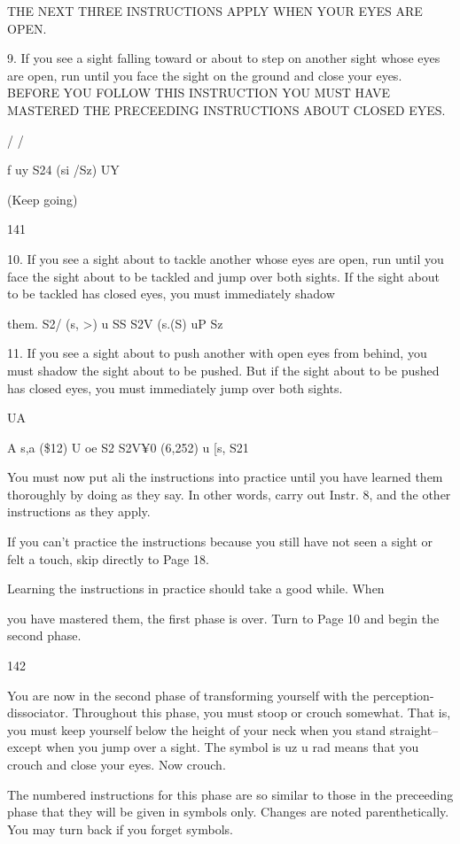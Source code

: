 \documentclass[10pt,twoside]{memoir}
\begin{document}
\begin{enumerate}
{\begin{enumerate}
\begin{sysrules}
\begin{sysrules}
\begin{sysrules}
\begin{sysrules}
{\begin{enumerate}
\begin{sysrules}
\begin{enumerate}
THE NEXT THREE INSTRUCTIONS APPLY WHEN YOUR EYES 
ARE OPEN. 


9. If you see a sight falling toward or about to step on another sight 
whose eyes are open, run until you face the sight on the ground and close 
your eyes. BEFORE YOU FOLLOW THIS INSTRUCTION YOU MUST 
HAVE MASTERED THE PRECEEDING INSTRUCTIONS ABOUT 
CLOSED EYES. 


/ 
/ 


f 
uy S24 (si /Sz) UY 


(Keep going) 


141 


10. If you see a sight about to tackle another whose eyes are open, run 
until you face the sight about to be tackled and jump over both sights. If the 
sight about to be tackled has closed eyes, you must immediately shadow 


them. 
S2/ (s, \e>) u SS 
S2V (s.(S) uP Sz 


11. If you see a sight about to push another with open eyes from 
behind, you must shadow the sight about to be pushed. But if the sight 
about to be pushed has closed eyes, you must immediately jump over both 
sights. 


UA 


A s,a (\$12) U oe S2 
S2V¥0 (6,252) u [s, S21 


You must now put ali the instructions into practice until you have 
learned them thoroughly by doing as they say. In other words, carry out 
Instr. 8, and the other instructions as they apply. 


If you can't practice the instructions because you still have not seen a 
sight or felt a touch, skip directly to Page 18. 


Learning the instructions in practice should take a good while. When 


you have mastered them, the first phase is over. Turn to Page 10 and begin 
the second phase. 


142 


You are now in the second phase of transforming yourself with the 
perception-dissociator. Throughout this phase, you must stoop or crouch 
somewhat. That is, you must keep yourself below the height of your neck 
when you stand straight-- except when you jump over a sight. The symbol is 
uz u rad means that you crouch and close your eyes. Now crouch. 


The numbered instructions for this phase are so similar to those in the 
preceeding phase that they will be given in symbols only. Changes are noted 
parenthetically. You may turn back if you forget symbols. 



\end{enumerate}
\end{sysrules}
\end{enumerate}}
\end{sysrules}
\end{sysrules}
\end{sysrules}
\end{sysrules}
\end{enumerate}}
\end{enumerate}
\end{document}

